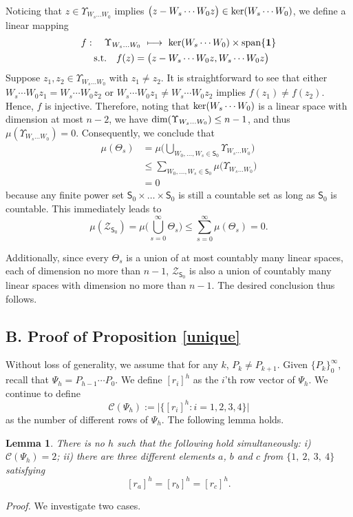 \documentclass[a4paper, 11pt]{article}
\newtheorem{lemma}{Lemma}
\begin{document}
Noticing that $z\in \Upsilon_{W_s\dots W_0}$ implies $\big(z-W_s\cdots W_0z \big)\in {\rm ker}(W_s \cdots W_0 )$, we define a linear mapping
\begin{align}
& f:\ \ \ \Upsilon_{W_s\dots W_0}\  \longmapsto\  {\rm ker}(W_s\cdots W_0)\times{\rm span}\{\mathbf{1}\}\nonumber\\
& \ \ \ \ {\rm s.t.}\ \ \ f(z)=\big(z-W_s\cdots W_0z,W_s\cdots W_0z\big)
\end{align}
 Suppose $z_1,z_2\in \Upsilon_{W_s\dots W_0}$ with $z_1\neq z_2$. It is straightforward to see that either $W_s\cdots W_0z_1=W_s\cdots W_0z_2$ or $W_s\cdots W_0z_1\neq W_s\cdots W_0z_2$ implies $f(z_1)\neq f(z_2)$. Hence, $f$ is  injective. Therefore, noting that ${\rm ker}(W_s\cdots W_0)$ is a linear space with dimension at most $n-2$, we have ${\rm dim}(\Upsilon_{W_s\dots W_0})\leq n-1$, and thus ${\mu}(\Upsilon_{W_s\dots W_0})=0$. Consequently, we conclude that
\begin{align}
{\mu}(\Theta_s)&= {\mu} \Big( \bigcup_{W_0,\dots,W_s\in \mathsf{S}_0} \Upsilon_{W_s\dots W_0}\Big)\nonumber\\
&\leq \sum_{W_0,\dots,W_s\in \mathsf{S}_0}{\mu}\big(\Upsilon_{W_s\dots W_0}\big)\nonumber\\
&=0 \nonumber
\end{align}
because any finite power set  $\mathsf{S}_0\times \dots \times \mathsf{S}_0$ is still a countable set as long as $\mathsf{S}_0$ is countable. This immediately leads to
$$
{\mu}(\mathscr{Z}_{\mathsf{S}_0})={\mu}\Big(\bigcup_{s=0}^\infty\Theta_s\Big)\leq \sum_{s=0}^\infty {\mu}(\Theta_s)=0.
$$

Additionally, since every $\Theta_s$ is a union of at most countably many linear spaces, each of dimension no more than $n-1$, $\mathscr{Z}_{\mathsf{S}_0}$ is also a union of countably many linear spaces with dimension no more than $n-1$. The desired conclusion thus follows.



\subsection*{B. Proof of Proposition \ref{unique}}
Without loss of generality, we assume that for any $k$, $P_k\neq P_{k+1}$. Given $\{P_k\}_0^\infty$, recall that $\Psi_h= P_{h-1}\cdots P_0$. We define  $[{r}_i]^h$ as the $i$'th row vector of $\Psi_h$. We continue to define
$$
\mathscr{C}(\Psi_h):= \Big| \big\{[{r}_i]^h: i=1,2,3,4\big\} \Big|
$$
as the number of different rows of $\Psi_h$. The following lemma holds.
\begin{lemma}\label{no3points}
There is no $h$ such that  the following hold simultaneously: i) $\mathscr{C}(\Psi_h)=2$; ii) there are three different elements $a$, $b$ and $c$ from $\{1,\ 2,\ 3,\ 4\}$ satisfying
$$
[{r}_a]^h=[{r}_b]^h=[{r}_c]^h.
$$
\end{lemma}
{\it Proof.} We investigate two cases.
\end{document}

